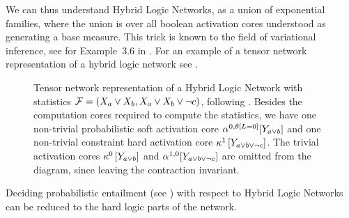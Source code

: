 
We can thus understand Hybrid Logic Networks, as a union of exponential families, where the union is over all boolean activation cores understood as generating a base measure.
This trick is known to the field of variational inference, see for Example~3.6 in \cite{wainwright_graphical_2008}.
For an example of a tensor network representation of a hybrid logic network see .






\begin{figure}[h]
    \begin{center}
        
    \end{center}
    \caption{Tensor network representation of a Hybrid Logic Network with statistics $\mathcal{F}=(X_{a}\lor X_{b},X_{a}\lor X_{b}\lor \lnot c)$, following .
    Besides the computation cores required to compute the statistics, we have one non-trivial \textcolor{\probcolor}{probabilistic soft activation core $\alpha^{0,\theta\left[L=0\right]}[Y_{a\lor b}]$} and one non-trivial \textcolor{\concolor}{constraint hard activation core $\kappa^{1}\left[Y_{a\lor b \lor \lnot c}\right]$}.
    The trivial activation cores $\kappa^{0}\left[Y_{a\lor b}\right]$ and $\alpha^{1,0}[Y_{a\lor b \lor \lnot c}]$ are omitted from the diagram, since leaving the contraction invariant.}
    \label{fig:ActivatedHeads}
\end{figure}




Deciding probabilistic entailment (see ) with respect to Hybrid Logic Networks can be reduced to the hard logic parts of the network.

